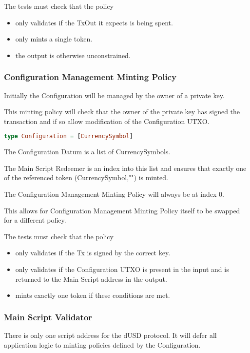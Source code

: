 \documentclass{article} %
\begin{document}
The tests must check that the policy
\begin{itemize}
  \item only validates if the TxOut it expects is being spent.
  \item only mints a single token.
  \item the output is otherwise unconstrained.
\end{itemize}

\subsubsection{Configuration Management Minting Policy}
Initially the Configuration will be managed by the owner of a private key.

This minting policy will check that the owner of the private key has signed the transaction and if so allow modification of the Configuration UTXO.

\begin{lstlisting}[language=Haskell]
type Configuration = [CurrencySymbol]
\end{lstlisting}

The Configuration Datum is a list of CurrencySymbols.

The Main Script Redeemer is an index into this list and ensures that exactly one of the referenced token (CurrencySymbol,"") is minted.

The Configuration Management Minting Policy will always be at index 0.

This allows for Configuration Management Minting Policy itself to be swapped for a different policy.

The tests must check that the policy
\begin{itemize}
  \item only validates if the Tx is signed by the correct key.
  \item only validates if the Configuration UTXO is present in the input and is returned to the Main Script address in the output.
  \item mints exactly one token if these conditions are met.
\end{itemize}

\subsubsection{Main Script Validator}
There is only one script address for the dUSD protocol. It will defer all application logic to minting policies defined by the Configuration.
\end{document}
